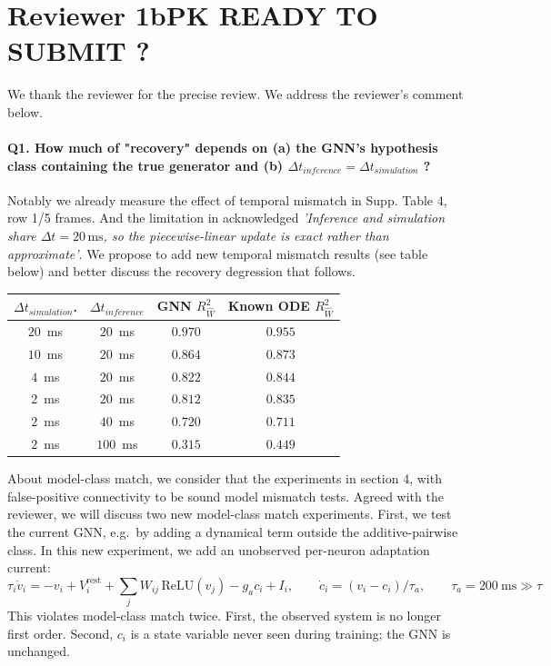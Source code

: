 \documentclass[11pt]{article}
\newcommand{\Rw}{R^2_{\widehat W}}
\begin{document}
\section*{Reviewer 1bPK READY TO SUBMIT ?}
We thank the reviewer for the precise review. We address the reviewer's comment below.

\paragraph{Q1. How much of "recovery" depends on (a) the GNN's hypothesis class containing the true generator and (b) $\Delta t_{inference} = \Delta t_{simulation}$ ? } Notably we already measure the effect of temporal mismatch in Supp. Table 4, row 1/5 frames.  And the limitation in acknowledged \emph{'Inference and simulation share $\Delta t = 20\,\text{ms}$, so the piecewise-linear update is exact rather than approximate'}. We propose to add new temporal mismatch results (see table below) and better discuss the recovery degression that follows.

\begin{center}
{\footnotesize
\begin{tabular}{cccc}
\toprule
$\Delta t_{simulation}$. & $\Delta t_{inference}$ & GNN $\Rw$ & Known ODE $\Rw$ \\
\midrule
$20$~ms & $20$~ms  & $0.970$    & $0.955$ \\
$10$~ms & $20$~ms  & $0.864$    & $0.873$ \\
$4$~ms  & $20$~ms  & $0.822$    & $0.844$ \\
$2$~ms  & $20$~ms  & $0.812$    & $0.835$ \\
\midrule
$2$~ms  & $40$~ms  & $0.720$    & $0.711$ \\
$2$~ms  & $100$~ms & $0.315$    & $0.449$ \\
\bottomrule
\end{tabular}}
\end{center}

\label{link3}

About model-class match, we consider that the experiments in section 4, with false-positive connectivity to be sound model mismatch tests.
Agreed with the reviewer, we will discuss two new model-class match experiments. 
First, we test the current GNN, e.g.\ by adding a dynamical term outside the additive-pairwise class. 
In this new experiment, we add an unobserved per-neuron adaptation current:
\[
  \tau_i \dot v_i = -v_i + V_i^{\mathrm{rest}}
  + \sum_j W_{ij}\,\mathrm{ReLU}(v_j) - g_a c_i + I_i,
  \qquad
  \dot c_i = (v_i - c_i)/\tau_a ,
  \qquad
  \tau_a = 200~\mathrm{ms} \gg \tau
\]
This violates model-class match twice. First, the observed system is no longer
first order. Second, $c_i$ is a state variable never seen during training; the
GNN is unchanged.
 
\end{document}
